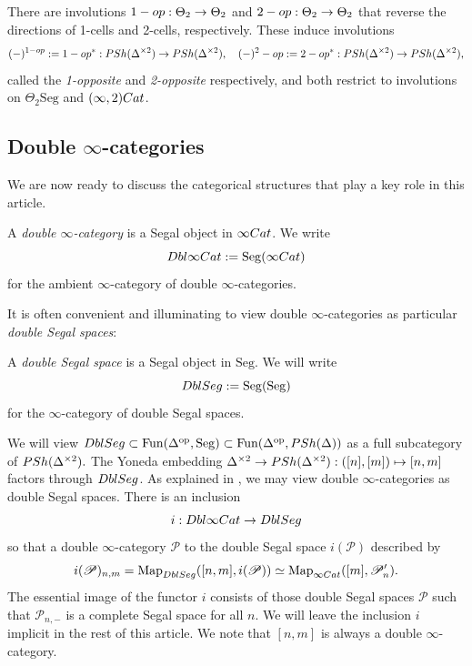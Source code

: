 \documentclass[a4paper, 11pt]{amsart}
\numberwithin{theorem}{section}
\theoremstyle{definition}
\newcommand{\cat}[1]{\textup{#1}}
\newcommand{\op}{\mathrm{op}}
\newcommand{\map}{\mathrm{Map}}
\newcommand{\fun}{\mathrm{Fun}}
\newcommand{\Cat}{\cat{Cat}}
\newcommand{\opo}{\textup{\textrm{1-op}}}
\newcommand{\opt}{\textup{\textrm{2-op}}}
\renewcommand{\P}{\mathscr{P}}
\newcommand{\Seg}{\mathrm{Seg}}
\newcommand{\DbliCat}{\cat{Dbl}\infty\cat{Cat}}
\newcommand{\DblSeg}{\cat{DblSeg}}
\newcommand{\PSh}{\cat{PSh}}
\begin{document}
\begin{construction}
	There are involutions $\opo : \Theta_2 \to \Theta_2$ and $\opt : \Theta_2 \to \Theta_2$ that reverse 
	the directions of 1-cells and 2-cells, respectively. These induce involutions 
	$$
	(-)^{\opo} := \opo^* : \PSh(\Delta^{\times 2}) \rightarrow \PSh(\Delta^{\times 2}), \quad (-)^\opt := \opt^* : \PSh(\Delta^{\times 2}) \rightarrow \PSh(\Delta^{\times 2}),
	$$
	called the \textit{1-opposite} and \textit{2-opposite} respectively, and both restrict to involutions on 
	$\Theta_2\Seg$ and $(\infty,2)\Cat$.
\end{construction}

\subsection{Double $\infty$-categories}\label{ssection.dbl-cats} We are now ready to discuss the categorical structures that 
play a key role in this article.

\begin{definition}	
	A  \textit{double $\infty$-category} is a Segal object in $\infty\Cat$. We write $$\DbliCat := \Seg(\infty\Cat)$$ for the 
	ambient $\infty$-category of double $\infty$-categories.
\end{definition} 

It is often convenient and illuminating to view double $\infty$-categories as particular \textit{double Segal spaces}:
\begin{definition}
	A \textit{double Segal space} is a  Segal object in $\Seg$.
		We will write
		$$\DblSeg := \Seg(\Seg)$$ for the $\infty$-category of double Segal spaces.
\end{definition}


\begin{remark}\label{con.dbl-infty-vs-dbl-segal}
	We will view $\DblSeg \subset \fun(\Delta^\op, \Seg) \subset \fun(\Delta^\op, \PSh(\Delta))$ as a full subcategory of  $\PSh(\Delta^{\times 2}).$ 
	The Yoneda embedding $\Delta^{\times 2} \to \PSh(\Delta^{\times 2}) : ([n], [m]) \mapsto [n,m]$ factors through $\DblSeg$.
	As explained in \cite[Remark 3.35]{Comp}, we may view double $\infty$-categories as double Segal spaces. There is an inclusion
	$$
	i :\DbliCat \rightarrow \DblSeg
	$$
	so that a double $\infty$-category $\P$ to the double Segal space $i(\P)$ described by
	$$
	i(\P)_{n,m} = \map_{\DblSeg}([n,m], i(\P)) \simeq \map_{\infty\Cat}([m], \P_n').
	$$
	The essential image of the functor $i$ consists of those 
	double Segal spaces $\P$ such that $\P_{n,-}$ is a complete Segal space for all $n$. We will leave the inclusion 
	$i$ implicit in the rest of this article. We note that $[n,m]$ is always a double $\infty$-category.
\end{remark}
\end{document}
